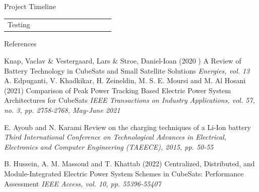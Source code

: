 \documentclass[aspectratio=169]{beamer}
\begin{document}
\begin{frame}{Project Timeline}
\begin{table}[]
\begin{tabular}{|c|l|l|l|l|l|l|l|l|l|l|l}
		Testing                                 &                                                                                      &                                                                                       &                                                                                       &                                                                                       &                                                                                      &                                                                                       &                                                                                       & \cellcolor[HTML]{FFCB2F}                                                              & \cellcolor[HTML]{FFCB2F}                                                             & \cellcolor[HTML]{FFCB2F}                                                              &                      \\ \cline{1-11}
	\end{tabular}
\end{table}
	\end{frame}
	
	
	
	\begin{frame}[allowframebreaks]{References}
	
	\begin{thebibliography}{9}
			
		Knap, Vaclav \& Vestergaard, Lars \& Stroe, Daniel-Ioan (2020	)
		\newblock A Review of Battery Technology in CubeSats
		and Small Satellite Solutions
		\newblock \emph{Energies, vol. 13}	
			A. Edpuganti, V. Khadkikar, H. Zeineldin, M. S. E. Moursi and M. Al Hosani (2021)
			\newblock Comparison of Peak Power Tracking Based Electric Power System Architectures for CubeSats
			\newblock \emph{IEEE Transactions on Industry Applications, vol. 57, no. 3, pp. 2758-2768, May-June 2021}
			
		E. Ayoub and N. Karami 
		\newblock Review on the charging techniques of a Li-Ion battery
		\newblock \emph{Third International Conference on Technological Advances in Electrical, Electronics and Computer Engineering (TAEECE), 2015, pp. 50-55}
		
	
		
	B. Hussein, A. M. Massoud and T. Khattab (2022)
	\newblock Centralized, Distributed, and Module-Integrated Electric Power System Schemes in CubeSats: Performance Assessment
	\newblock \emph{ IEEE Access, vol. 10, pp. 55396-55407}
	
	






	\end{thebibliography}
	\end{frame}
	
	\begin{frame}
		
		
	\end{frame}
\end{document}
